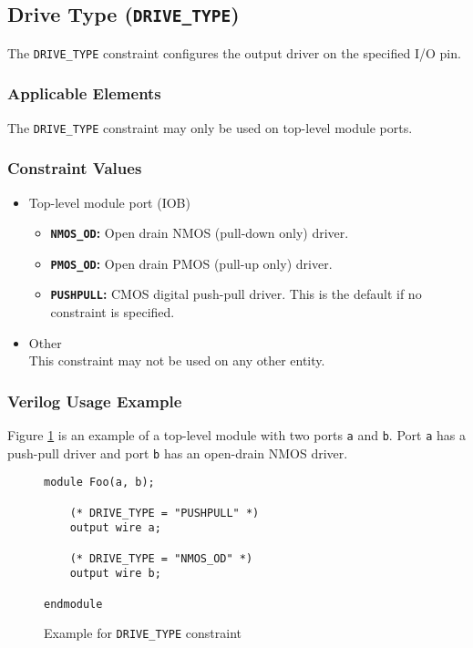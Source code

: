 \documentclass[11pt]{article}
\newcommand{\tokenstyle}[1]{\texttt{#1}}
\newcommand{\wirestyle}[1]{\texttt{#1}}
\newcommand{\valuestyle}[1]{\texttt{#1}}
\newcommand{\strvaluestyle}[1]{\valuestyle{\textquotedbl#1\textquotedbl}}
\newcommand{\strexamplestyle}[1]{\textbf{\strvaluestyle{#1}:}}
\newcommand{\whenstyle}[1]{{\fontseries{sb}\selectfont#1}}
\begin{document}

\pagebreak
\subsection{Drive Type (\tokenstyle{DRIVE\_TYPE})}

The \tokenstyle{DRIVE\_TYPE} constraint configures the output driver on the specified I/O pin.

\subsubsection{Applicable Elements}
The \tokenstyle{DRIVE\_TYPE} constraint may only be used on top-level module ports.

\subsubsection{Constraint Values}
\begin{itemize}
\item \whenstyle{Top-level module port (IOB)}
	\begin{itemize}
		\item \strexamplestyle{NMOS\_OD} Open drain NMOS (pull-down only) driver.
		\item \strexamplestyle{PMOS\_OD} Open drain PMOS (pull-up only) driver.
		\item \strexamplestyle{PUSHPULL} CMOS digital push-pull driver. This is the default if no constraint is specified.
	\end{itemize}
\item \whenstyle{Other} \\
This constraint may not be used on any other entity.
\end{itemize}

\subsubsection{Verilog Usage Example}

Figure \ref{constraint-drivetype} is an example of a top-level module with two ports \wirestyle{a} and \wirestyle{b}. Port \wirestyle{a} has a push-pull driver and port \wirestyle{b} has an open-drain NMOS driver.

\begin{figure}[h]
\begin{lstlisting}
module Foo(a, b);

	(* DRIVE_TYPE = "PUSHPULL" *)
	output wire a;

	(* DRIVE_TYPE = "NMOS_OD" *)
	output wire b;

endmodule
\end{lstlisting}
\caption{Example for \tokenstyle{DRIVE\_TYPE} constraint}
\label{constraint-drivetype}
\end{figure}
\end{document}
